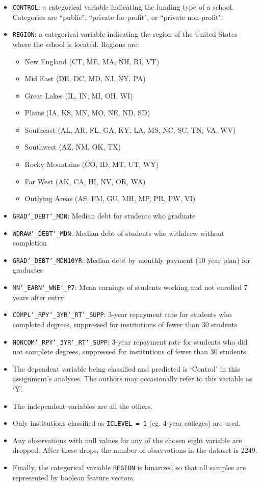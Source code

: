 \documentclass[10pt,twocolumn]{article}
\begin{document}
\begin{itemize}
\item \texttt{CONTROL}: a categorical variable indicating the funding type of a school.
Categories are ``public", ``private for-profit", or ``private non-profit".
\item \texttt{REGION}: a categorical variable indicating the region of the United States
where the school is located. Regions are:
\begin{itemize}
\item New England (CT, ME, MA, NH, RI, VT)
\item Mid East (DE, DC, MD, NJ, NY, PA)
\item Great Lakes (IL, IN, MI, OH, WI)
\item Plains (IA, KS, MN, MO, NE, ND, SD)
\item Southeast (AL, AR, FL, GA, KY, LA, MS, NC, SC, TN, VA, WV)
\item Southwest (AZ, NM, OK, TX)
\item Rocky Mountains (CO, ID, MT, UT, WY)
\item Far West (AK, CA, HI, NV, OR, WA)
\item Outlying Areas (AS, FM, GU, MH, MP, PR, PW, VI)
\end{itemize}
\item \texttt{GRAD\char`_DEBT\char`_MDN}: Median debt for students who graduate
\item \texttt{WDRAW\char`_DEBT\char`_MDN}: Median debt of students who withdrew without completion
\item \texttt{GRAD\char`_DEBT\char`_MDN10YR}: Median debt by monthly payment (10 year plan) for graduates
\item \texttt{MN\char`_EARN\char`_WNE\char`_P7}: Mean earnings of students working and not enrolled 7 years
after entry
\item \texttt{COMPL\char`_RPY\char`_3YR\char`_RT\char`_SUPP}: 3-year repayment rate for students who completed degrees,
suppressed for institutions of fewer than 30 students
\item \texttt{NONCOM\char`_RPY\char`_3YR\char`_RT\char`_SUPP}: 3-year repayment rate for students who did not
complete degrees, suppressed for institutions of fewer than 30 students
\item The dependent variable being classified and predicted is `Control' in this assignment's
analyses. The authors may occasionally refer to this variable as `Y'.
\item The independent variables are all the others.
\item Only institutions classified as \texttt{ICLEVEL = 1} (eg. 4-year colleges) are used.
\item Any observations with null values for any of the chosen eight variable
are dropped. After these drops, the number of observations
in the dataset is 2249.
\item Finally, the categorical variable \texttt{REGION} is binarized so that all samples
are represented by boolean feature vectors.
\end{itemize}
\end{document}
